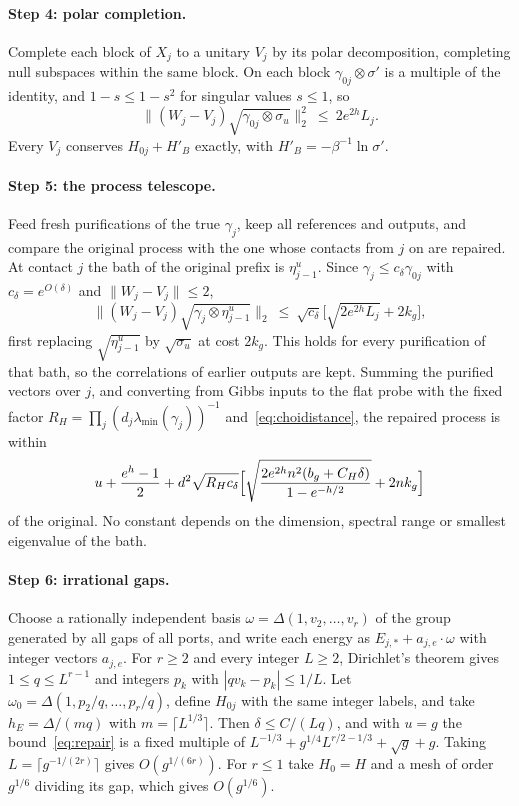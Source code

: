 \documentclass[11pt]{article}
\theoremstyle{definition}
\theoremstyle{remark}
\begin{document}
\paragraph{Step 4: polar completion.} Complete each block of $X_j$ to a unitary $V_j$ by its polar decomposition, completing null subspaces within the same block. On each block $\gamma_{0j}\otimes\sigma'$ is a multiple of the identity, and $1-s\le1-s^2$ for singular values $s\le1$, so
\[
\|(W_j-V_j)\sqrt{\gamma_{0j}\otimes\sigma_u}\|_2^2\ \le\ 2e^{2h}L_j.
\]
Every $V_j$ conserves $H_{0j}+H'_B$ exactly, with $H'_B=-\beta^{-1}\ln\sigma'$.

\paragraph{Step 5: the process telescope.} Feed fresh purifications of the true $\gamma_j$, keep all references and outputs, and compare the original process with the one whose contacts from $j$ on are repaired. At contact $j$ the bath of the original prefix is $\eta^u_{j-1}$. Since $\gamma_j\le c_\delta\gamma_{0j}$ with $c_\delta=e^{O(\delta)}$ and $\|W_j-V_j\|\le2$,
\[
\|(W_j-V_j)\sqrt{\gamma_j\otimes\eta^u_{j-1}}\|_2\ \le\ \sqrt{c_\delta}\bigl[\sqrt{2e^{2h}L_j}+2k_g\bigr],
\]
first replacing $\sqrt{\eta^u_{j-1}}$ by $\sqrt{\sigma_u}$ at cost $2k_g$. This holds for every purification of that bath, so the correlations of earlier outputs are kept. Summing the purified vectors over $j$, and converting from Gibbs inputs to the flat probe with the fixed factor $R_H=\prod_j(d_j\lambda_{\min}(\gamma_j))^{-1}$ and~\eqref{eq:choidistance}, the repaired process is within
\begin{equation}\label{eq:repair}
u+\frac{e^h-1}2+d^2\sqrt{R_Hc_\delta}\Bigl[\sqrt{\frac{2e^{2h}n^2(b_g+C_H\delta)}{1-e^{-h/2}}}+2nk_g\Bigr]
\end{equation}
of the original. No constant depends on the dimension, spectral range or smallest eigenvalue of the bath.

\paragraph{Step 6: irrational gaps.} Choose a rationally independent basis $\omega=\Delta(1,v_2,\dots,v_r)$ of the group generated by all gaps of all ports, and write each energy as $E_{j,*}+a_{j,e}\cdot\omega$ with integer vectors $a_{j,e}$. For $r\ge2$ and every integer $L\ge2$, Dirichlet's theorem gives $1\le q\le L^{r-1}$ and integers $p_k$ with $|qv_k-p_k|\le1/L$. Let $\omega_0=\Delta(1,p_2/q,\dots,p_r/q)$, define $H_{0j}$ with the same integer labels, and take $h_E=\Delta/(mq)$ with $m=\lceil L^{1/3}\rceil$. Then $\delta\le C/(Lq)$, and with $u=g$ the bound~\eqref{eq:repair} is a fixed multiple of $L^{-1/3}+g^{1/4}L^{r/2-1/3}+\sqrt g+g$. Taking $L=\lceil g^{-1/(2r)}\rceil$ gives $O(g^{1/(6r)})$. For $r\le1$ take $H_0=H$ and a mesh of order $g^{1/6}$ dividing its gap, which gives $O(g^{1/6})$.
\end{document}
